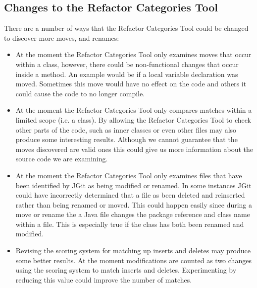 \subsection{Changes to the Refactor Categories Tool}

There are a number of ways that the Refactor Categories Tool could be changed to discover more moves, and renames:

\begin{itemize}

  \item At the moment the Refactor Categories Tool only examines moves that occur within a class, however, there could be non-functional changes that occur inside a method. 
An example would be if a local variable declaration was moved.
Sometimes this move would have no effect on the code and others it could cause the code to no longer compile.
  
  \item At the moment the Refactor Categories Tool only compares matches within a limited scope (i.e. a class).  
  By allowing the Refactor Categories Tool to check other parts of the code, such as inner classes or even other files may also produce some interesting results.
Although we cannot guarantee that the moves discovered are valid ones this could give us more information about the source code we are examining.

  \item At the moment the Refactor Categories Tool only examines files that have been identified by JGit as being modified or renamed.
In some instances JGit could have incorrectly determined that a file as been deleted and reinserted rather than being renamed or moved.
This could happen easily since during a move or rename the a Java file changes the package reference and class name within a file.
This is especially true if the class has both been renamed and modified.

  \item Revising the scoring system for matching up inserts and deletes may produce some better results.
At the moment modifications are counted as two changes using the scoring system to match inserts and deletes.
Experimenting by reducing this value could improve the number of matches.

\end{itemize}




